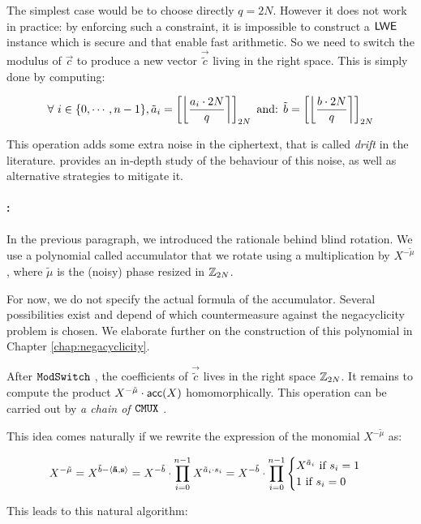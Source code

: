 The simplest case would be to choose directly $q = 2N$. However it does not work in practice: by enforcing such a constraint, it is impossible to construct a $\textsf{LWE}$ instance which is secure and that enable fast arithmetic. So we need to switch the modulus of $\vec c$ to produce a new vector $\vec{\tilde c}$ living in the right space. This is simply done by computing:

\[
	\forall~i \in \{0, \cdots, n-1\}, \tilde a_i = \left [ \left \lfloor \frac{a_i \cdot 2N}{q} \right \rceil \right ]_{2N} \text{ and: } \tilde b = \left [ \left \lfloor \frac{b \cdot 2N}{q} \right \rceil \right ]_{2N}
\]


This operation adds some extra noise in the ciphertext, that is called \textit{drift} in the literature. \cite{joye_drift} provides an in-depth study of the behaviour of this noise, as well as alternative strategies to mitigate it.


\paragraph{\BlindRotate:}

In the previous paragraph, we introduced the rationale behind blind rotation. We use a polynomial called accumulator that we rotate using a multiplication by $X^{-\tilde \mu}$, where $\tilde \mu$ is the (noisy) phase resized in $\mathbb{Z}_{2N}$.

For now, we do not specify the actual formula of the accumulator. Several possibilities exist and depend of which countermeasure against the negacyclicity problem is chosen. We elaborate further on the construction of this polynomial in Chapter \ref{chap:negacyclicity}.


After $\texttt{ModSwitch}~$, the coefficients of $\vec{\tilde{c}}$ lives in the right space $\mathbb{Z}_{2N}$. It remains to compute the product $X^{-\tilde \mu} \cdot \textsf{acc}(X)$ homomorphically. This operation can be carried out by \textit{a chain of $\texttt{CMUX}~$}.


This idea comes naturally if we rewrite the expression of the monomial $X^{-\tilde \mu}$ as:

\[
	X^{-\tilde \mu} = X^{\tilde b - \left \langle \mathbf{\tilde a}, \mathbf s \right \rangle} =  X^{-\tilde b} \cdot \prod_{i=0}^{n-1} X^{\tilde a_i \cdot s_i} = X^{-\tilde b} \cdot \prod_{i=0}^{n-1} \begin{cases}
		X^{\tilde a_i} \text{ if } s_i = 1\\
		1 \text{ if } s_i = 0
	\end{cases}
\]


This leads to this natural algorithm:


